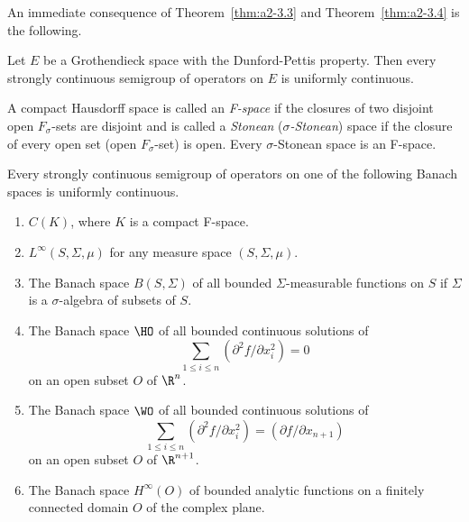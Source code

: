 An immediate consequence of Theorem~\ref{thm:a2-3.3}   and Theorem~\ref{thm:a2-3.4}   is the following.
\begin{theorem}\label{thm:a2-3.5}
Let $E$ be a Grothendieck space with the Dunford-Pettis property.
Then every strongly continuous semigroup of operators on $E$ is uniformly continuous.
\end{theorem}
A compact Hausdorff space is called an \emph{F-space} if the closures of two disjoint open $F_{\sigma}$-sets are disjoint and is called a \emph{Stonean} (\resp \emph{$\sigma$-Stonean}) space if the closure of every open set (\resp open $F_{\sigma}$-set) is open.
Every $\sigma$-Stonean space is an F-space.
\begin{theorem}\label{thm:a2-3.6}
Every strongly continuous semigroup of operators on one of the following Banach spaces is uniformly continuous.
\begin{enumerate}[\upshape (i)]
\item \label{thm:a2-3.6-1}
$C(K)$, where $K$ is a compact F-space.
\item \label{thm:a2-3.6-2}
$L^{\infty}(S,\Sigma,\mu)$ for any measure space $(S,\Sigma,\mu)$.
\item \label{thm:a2-3.6-3}
The Banach space $B(S,\Sigma)$ of all bounded $\Sigma$-measurable functions on $S$ if  $\Sigma$ is a  $\sigma$-algebra of subsets of\/ $S$.
\item \label{thm:a2-3.6-4}
The Banach space $\HO$ of all bounded continuous solutions of
\[
\sum_{1 \leq i \leq n} (\partial^2f/\partial x_i^2) = 0
\]
on an open subset $O$ of\/ $\R^n$.
\item \label{thm:a2-3.6-5}
The Banach space $\WO$ of all bounded continuous solutions of
\[
\sum_{1 \leq i \leq n} (\partial^2f/\partial x_i^2) = (\partial f/\partial x_{n+1})
\]
on an open subset $O$ of  $\R^{n+1}$.
\item \label{thm:a2-3.6-6}
The Banach space $H^{\infty}(O)$ of bounded analytic functions on a finitely connected domain $O$ of the complex plane.
\end{enumerate}
\end{theorem}
